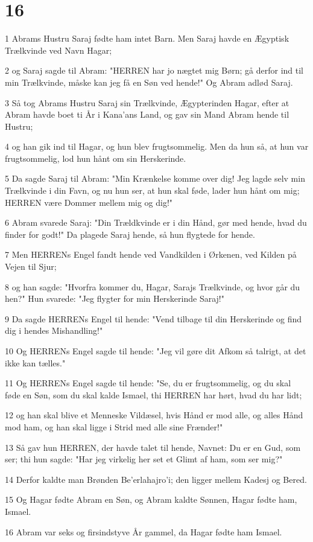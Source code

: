 \chapter{16}

\par 1 Abrams Hustru Saraj fødte ham intet Barn. Men Saraj havde en Ægyptisk Trælkvinde ved Navn Hagar;
\par 2 og Saraj sagde til Abram: "HERREN har jo nægtet mig Børn; gå derfor ind til min Trælkvinde, måske kan jeg få en Søn ved hende!" Og Abram adlød Saraj.
\par 3 Så tog Abrams Hustru Saraj sin Trælkvinde, Ægypterinden Hagar, efter at Abram havde boet ti År i Kana'ans Land, og gav sin Mand Abram hende til Hustru;
\par 4 og han gik ind til Hagar, og hun blev frugtsommelig. Men da hun så, at hun var frugtsommelig, lod hun hånt om sin Herskerinde.
\par 5 Da sagde Saraj til Abram: "Min Krænkelse komme over dig! Jeg lagde selv min Trælkvinde i din Favn, og nu hun ser, at hun skal føde, lader hun hånt om mig; HERREN være Dommer mellem mig og dig!"
\par 6 Abram svarede Saraj: "Din Trældkvinde er i din Hånd, gør med hende, hvad du finder for godt!" Da plagede Saraj hende, så hun flygtede for hende.
\par 7 Men HERRENs Engel fandt hende ved Vandkilden i Ørkenen, ved Kilden på Vejen til Sjur;
\par 8 og han sagde: "Hvorfra kommer du, Hagar, Sarajs Trælkvinde, og hvor går du hen?" Hun svarede: "Jeg flygter for min Herskerinde Saraj!"
\par 9 Da sagde HERRENs Engel til hende: "Vend tilbage til din Herskerinde og find dig i hendes Mishandling!"
\par 10 Og HERRENs Engel sagde til hende: "Jeg vil gøre dit Afkom så talrigt, at det ikke kan tælles."
\par 11 Og HERRENs Engel sagde til hende: "Se, du er frugtsommelig, og du skal føde en Søn, som du skal kalde Ismael, thi HERREN har hørt, hvad du har lidt;
\par 12 og han skal blive et Menneske Vildæsel, hvis Hånd er mod alle, og alles Hånd mod ham, og han skal ligge i Strid med alle sine Frænder!"
\par 13 Så gav hun HERREN, der havde talet til hende, Navnet: Du er en Gud, som ser; thi hun sagde: "Har jeg virkelig her set et Glimt af ham, som ser mig?"
\par 14 Derfor kaldte man Brønden Be'erlahajro'i; den ligger mellem Kadesj og Bered.
\par 15 Og Hagar fødte Abram en Søn, og Abram kaldte Sønnen, Hagar fødte ham, Ismael.
\par 16 Abram var seks og firsindstyve År gammel, da Hagar fødte ham Ismael.

